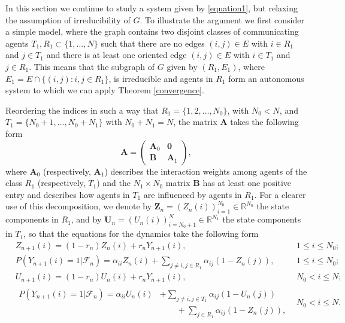 \documentclass[article,12pt]{article}
\theoremstyle{plain}
\theoremstyle{definition}
\theoremstyle{remark}
\numberwithin{equation}{section}
\numberwithin{theorem}{section}
\newcommand{\R}{\mathbb R}
\begin{document}
		In this section we continue to study a system given by \eqref{equation1}, but relaxing the assumption of irreducibility of $G$. To illustrate the argument we first consider a simple model, where the graph contains two disjoint classes of communicating agents $T_1, R_1\subset \{1,\ldots, N\}$ such that there are no edges $(i,j)\in E$ with $i\in R_1$ and $j\in T_1$ and 
		there is at least one oriented edge $(i, j)\in E$ with $i\in T_1$ and $j\in R_1$. 
		This means that the subgraph of $G$ given by  $(R_1, E_1)$, where  $E_1=E\cap \{(i, j): i, j\in R_1\}$, is irreducible and agents in $R_1$ form an autonomous system to which we can apply Theorem \ref{convergence}.
		
		Reordering the indices in such a way that $R_1=\{1, 2,\ldots, N_0\}$, with $N_0<N$, and $T_1=\{N_0+1,\ldots, N_0+N_1\}$ with $N_0+N_1=N$, the matrix $\mathbf{A}$ takes the following form 
		$$ \mathbf{A}=\left(\begin{array}{llcc}
			\mathbf{A}_0 &  \mathbf{0} \\
			\mathbf{B} & \mathbf{A}_1
		\end{array}\right),
		$$ 
		where $\mathbf{A}_0$ (respectively, $\mathbf{A}_1$) describes the  interaction weights among agents of the class $R_1$ (respectively, $T_1$) and the $N_1\times N_0$ matrix $\mathbf{B}$ has at least one positive entry and describes how agents in $T_1$ are influenced by agents in $R_1$. For a clearer use of this decomposition, we denote by $\mathbf{Z}_n= (Z_n(i))_{i=1}^{N_0}\in \R^{N_0}$ the state components in $R_1$, and by $\mathbf{U}_n=(U_n(i))_{i={N_0+1}}^{N}\in \R^{N_1}$ the state components in $T_1$, so that the equations for the dynamics take the following form
		\begin{align}
			&Z_{n+1}(i)=(1-r_n)Z_n(i) + r_n Y_{n+1}(i), &1\leq i\leq  N_0; \label{mainEQN1}\\
			&P\left(Y_{n+1}(i)=1|\mathcal{F}_n\right) = \alpha_{ii}Z_n(i)+ \sum_{j\neq i, j\in R_1}\alpha_{ij} \left(1-Z_n(j)\right), &1\leq i \leq N_0;\nonumber\\
			&U_{n+1}(i)=(1-r_n)U_n(i) + r_n Y_{n+1}(i), &N_0 < i \leq  N; \label{mainEQN2}\\
			&\begin{aligned}P\left(Y_{n+1}(i)=1|\mathcal{F}_n\right) = \alpha_{ii}U_n(i)&+ \sum_{j\neq i, j\in T_1}\alpha_{ij} \left(1-U_n(j)\right)\\
				&\qquad+\sum_{ j\in R_1}\alpha_{ij} \left(1-Z_n(j)\right),\end{aligned}  &N_0<i\leq  N.\nonumber
		\end{align}                                               
		
\end{document}
